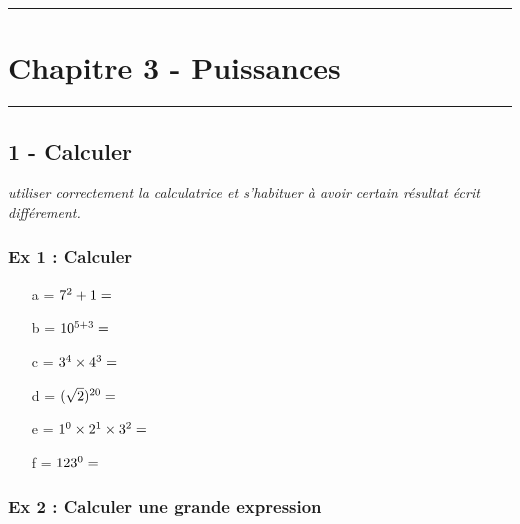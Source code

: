 \documentclass[12pt]{article}
\newcommand{\horrule}[1]{\rule{\linewidth}{#1}} %
\begin{document}

\newtheorem{Definition}{Définition}
\newtheorem{Theorem}{Théorème}
\newtheorem{Proposition}{Propriété}

\renewcommand{\labelitemi}{$\bullet$}
\renewcommand{\labelitemii}{$\circ$}

\setlength{\columnseprule}{1pt}

\horrule{2px}
\section*{Chapitre 3 - Puissances}
\horrule{2px}

\subsection*{1 - Calculer}

\textit{utiliser correctement la calculatrice et s'habituer à avoir certain résultat écrit différement.}

\subsubsection*{Ex 1 : Calculer}

\begin{multicols}{3}
  \begin{itemize}
  \item[a =] $7^2 + 1 =  \dotfill $
  \item[b =] $10^{5+3} =  \dotfill $
  \item[c =] $3^4 \times 4^3 =  \dotfill $
  \item[d =] $(\sqrt{2})^{20} =  \dotfill $
  \item[e =] $1^0 \times 2^1 \times 3^2 =  \dotfill $
  \item[f =] $123^0 =  \dotfill $
  \end{itemize}

\end{multicols}

\subsubsection*{Ex 2 : Calculer une grande expression }
\end{document}
